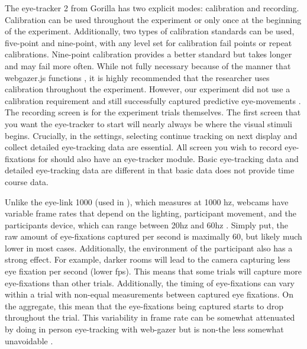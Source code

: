 The eye-tracker 2 from Gorilla has two explicit modes: calibration and recording. Calibration can be used throughout the experiment or only once at the beginning of the experiment. Additionally, two types of calibration standards can be used, five-point and nine-point, with any level set for calibration fail points or repeat calibrations. Nine-point calibration provides a better standard but takes longer and may fail more often. While not fully necessary because of the manner that webgazer.js functions \parencite[e.g.,][]{ Chen_et_al_2001}, it is highly recommended that the researcher uses calibration throughout the experiment. However, our experiment did not use a calibration requirement and still successfully captured predictive eye-movements \parencite[][]{Prystauka_Altmann_Rothman_2023}. The recording screen is for the experiment trials themselves. The first screen that you want the eye-tracker to start will nearly always be where the visual stimuli begins. Crucially, in the settings, selecting continue tracking on next display and collect detailed eye-tracking data are essential. All screen you wish to record eye-fixations for should also have an eye-tracker module. Basic eye-tracking data and detailed eye-tracking data are different in that basic data does not provide time course data. 

Unlike the eye-link 1000 (used in \parencite{Porretta_et_al_2020}), which measures at 1000 hz, webcams have variable frame rates that depend on the lighting, participant movement, and the participants device, which can range between 20hz and 60hz \parencite{Vos_2017}. Simply put, the raw amount of eye-fixations captured per second is maximally 60, but likely much lower in most cases. Additionally, the environment of the participant also has a strong effect. For example, darker rooms will lead to the camera capturing less eye fixation per second (lower fps). This means that some trials will capture more eye-fixations than other trials. \parencite{} Additionally, the timing of eye-fixations can vary within a trial with non-equal measurements between captured eye fixations. On the aggregate, this mean that the eye-fixations being captured starts to drop throughout the trial. This variability in frame rate can be somewhat attenuated by doing in person eye-tracking with web-gazer but is non-the less somewhat unavoidable \parencite[e.g.,][]{}{}{}. 

